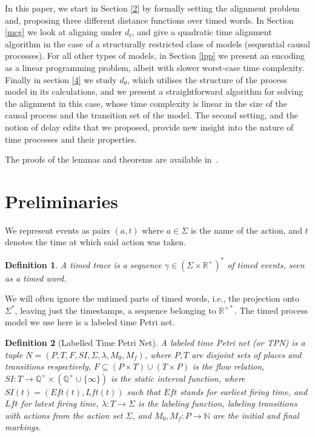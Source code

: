 \documentclass[conference]{IEEEtran}
\newtheorem{definition}{Definition}
\begin{document}

In this paper, we start in Section \ref{2} by formally setting the alignment problem and, proposing three different distance functions over timed words. 
In Section \ref{mcg} we look at aligning under $d_t$, and give a quadratic time alignment algorithm in the case of a structurally restricted class of models (sequential causal processes).
For all other types of models, in Section \ref{lpp} we present an encoding as a linear programming problem, albeit with slower worst-case time complexity. 
Finally in section \ref{4} we study $d_\theta$, which utilises the structure of the process model in its calculations, and we present a straightforward algorithm for solving the alignment in this case, whose time complexity is linear in the size of the causal process and the transition set of the model. The second setting, and the notion of delay edits that we proposed, provide new insight into the nature of time processes and their properties.

The proofs of the lemmas and theorems are available in~\cite{CR22}.

\section{Preliminaries}
We represent events as pairs $(a,t)$ where $a \in \Sigma$ is the name of the action, and $t$ denotes the time at which said action was taken.

\begin{definition}
	  A timed trace is a sequence $\gamma \in (\Sigma \times \mathbb{R}^+)^*$ of timed events, seen as a timed word. 
\end{definition}

We will often ignore the untimed parts of timed words, i.e., the projection onto $\Sigma^*$, leaving just the timestamps, a sequence belonging to $\mathbb{R}^{+*}$. 
The timed process model we use here is a labeled time Petri net. 

\begin{definition}[Labelled Time Petri Net] \label{tpn} A labeled \textit{time Petri net} (or TPN) is a tuple $N = (P, T, F, SI, \Sigma, \lambda, M_0, M_f)$, where $P, T$ are disjoint sets of places and transitions respectively,  $F \subseteq (P \times T) \cup (T \times P)$ is the flow relation,  $SI : T \rightarrow \mathbb{Q}^+ \times (\mathbb{Q}^+ \cup \{\infty\})$ is the static interval function, where $SI(t) = (Eft(t), Lft(t))$ such that $Eft$ stands for earliest firing time, and $Lft$ for latest firing time, $\lambda : T \rightarrow \Sigma$ is the labeling function, labeling transitions with actions from the action set $\Sigma$, and  $ M_0 , M_f: P \to \mathbb{N}$ are the initial and final markings. %
\end{definition}
\end{document}
